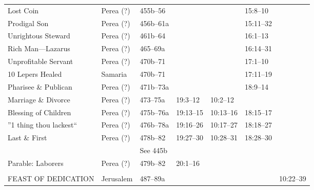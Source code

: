 \begin{longtable}[h]{l@{\hspace{0.5em}}l@{\hspace{0.5em}}l@{\hspace{0.5em}}BBBB}
\quad Lost Coin                            & Perea (?)           & 455b--56           &                   &                    & 15:8--10              & \\
\quad Prodigal Son                         & Perea (?)           & 456b--61a          &                   &                    & 15:11--32             & \\
\quad Unrightous Steward                   & Perea (?)           & 461b--64           &                   &                    & 16:1--13              & \\
\quad Rich Man---Lazarus                   & Perea (?)           & 465--69a           &                   &                    & 16:14--31             & \\
\quad Unprofitable Servant                 & Perea (?)           & 470b--71           &                   &                    & 17:1--10              & \\
10 Lepers Healed                           & Samaria             & 470b--71           &                   &                    & 17:11--19             & \\
Pharisee \& Publican                       & Perea (?)           & 471b--73a          &                   &                    & 18:9--14              & \\
Marriage \& Divorce                        & Perea (?)           & 473--75a           & 19:3--12          & 10:2--12           &                       & \\
Blessing of Children                       & Perea (?)           & 475b--76a          & 19:13--15         & 10:13--16          & 18:15--17             & \\
''1 thing thou lackest``                   & Perea (?)           & 476b--78a          & 19:16--26         & 10:17--27          & 18:18--27             & \\
Last \& First                              & Perea (?)           & 478b--82           & 19:27--30         & 10:28--31          & 18:28--30             & \\
                                           &                     & See 445b           &                   &                    &                       & \\
\quad Parable: Laborers                    & Perea (?)           & 479b--82           & 20:1--16          &                    &                       & \\
\\
FEAST OF DEDICATION                        & Jerusalem           & 487--89a           &                   &                    &                       & 10:22--39 \\

\end{longtable}
